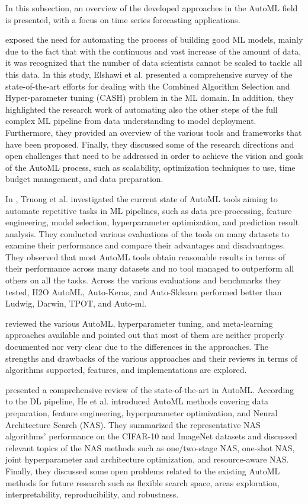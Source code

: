 In this subsection, an overview of the developed approaches in the AutoML field is presented, with a focus on time series forecasting applications.

\cite{Elshawi2019} exposed the need for automating the process of building good ML models, mainly due to the fact that with the continuous and vast increase of the amount of data, it was recognized that the number of data scientists cannot be scaled to tackle all this data.
In this study, Elshawi et al. presented a comprehensive survey of the state-of-the-art efforts for dealing with the Combined Algorithm Selection and Hyper-parameter tuning (CASH) problem in the ML domain.
In addition, they highlighted the research work of automating also the other steps of the full complex ML pipeline from data understanding to model deployment.
Furthermore, they provided an overview of the various tools and frameworks that have been proposed.
Finally, they discussed some of the research directions and open challenges that need to be addressed in order to achieve the vision and goals of the AutoML process, such as scalability, optimization techniques to use, time budget management, and data preparation.

In \cite{8995391}, Truong et al. investigated the current state of AutoML tools aiming to automate repetitive tasks in ML pipelines, such as data pre-processing, feature engineering, model selection, hyperparameter optimization, and prediction result analysis.
They conducted various evaluations of the tools on many datasets to examine their performance and compare their advantages and disadvantages.
They observed that most AutoML tools obtain reasonable results in terms of their performance across many datasets and no tool managed to outperform all others on all the tasks.
Across the various evaluations and benchmarks they tested, H2O AutoML, Auto-Keras, and Auto-Sklearn performed better than Ludwig, Darwin, TPOT, and Auto-ml.

\cite{9033810} reviewed the various AutoML, hyperparameter tuning, and meta-learning approaches available and pointed out that most of them are neither properly documented nor very clear due to the differences in the approaches.
The strengths and drawbacks of the various approaches and their reviews in terms of algorithms supported, features, and implementations are explored.

\cite{HE2021106622} presented a comprehensive review of the state-of-the-art in AutoML.
According to the DL pipeline, He et al. introduced AutoML methods covering data preparation, feature engineering, hyperparameter optimization, and Neural Architecture Search (NAS).
They summarized the representative NAS algorithms’ performance on the CIFAR-10 and ImageNet datasets and discussed relevant topics of the NAS methods such as one\slash two-stage NAS, one-shot NAS, joint hyperparameter and architecture optimization, and resource-aware NAS.
Finally, they discussed some open problems related to the existing AutoML methods for future research such as flexible search space, areas exploration, interpretability, reproducibility, and robustness.


